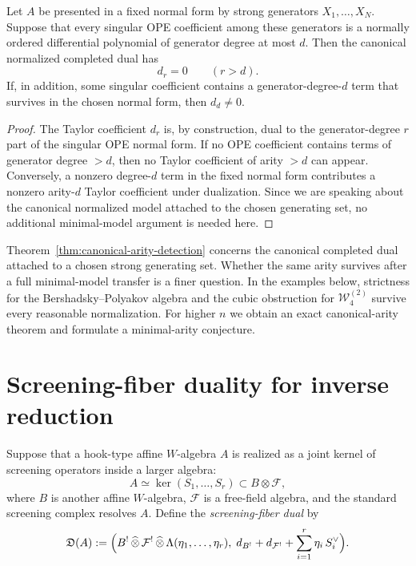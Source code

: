 \begin{theorem}
\label{thm:canonical-arity-detection}
Let $A$ be presented in a fixed normal form by strong generators
$X_1,\dots,X_N$.  Suppose that every singular OPE coefficient among these
generators is a normally ordered differential polynomial of generator degree at
most $d$.  Then the canonical normalized completed dual has
\[
d_r = 0 \qquad (r>d).
\]
If, in addition, some singular coefficient contains a generator-degree-$d$ term
that survives in the chosen normal form, then $d_d\neq 0$.
\end{theorem}

\begin{proof}
The Taylor coefficient $d_r$ is, by construction, dual to the generator-degree
$r$ part of the singular OPE normal form.  If no OPE coefficient contains terms
of generator degree $>d$, then no Taylor coefficient of arity $>d$ can appear.
Conversely, a nonzero degree-$d$ term in the fixed normal form contributes a
nonzero arity-$d$ Taylor coefficient under dualization.  Since we are speaking
about the canonical normalized model attached to the chosen generating set, no
additional minimal-model argument is needed here.
\end{proof}

\begin{remark}
Theorem~\ref{thm:canonical-arity-detection} concerns the canonical completed
dual attached to a chosen strong generating set.  Whether the same arity
survives after a full minimal-model transfer is a finer question.  In the
examples below, strictness for the Bershadsky--Polyakov algebra and the cubic
obstruction for $\mathcal W_4^{(2)}$ survive every reasonable normalization.
For higher $n$ we obtain an exact canonical-arity theorem and formulate a
minimal-arity conjecture.
\end{remark}

\section{Screening-fiber duality for inverse reduction}

\begin{construction}
\label{constr:screening-fiber-dual}
Suppose that a hook-type affine $W$-algebra $A$ is realized as a joint kernel of
screening operators inside a larger algebra:
\[
A \simeq \ker(S_1,\dots,S_r)\subset B\otimes \mathcal F,
\]
where $B$ is another affine $W$-algebra, $\mathcal F$ is a free-field algebra,
and the standard screening complex resolves $A$.  Define the
\emph{screening-fiber dual} by
\[
\mathfrak D(A):=
\Bigl(
B^!\,\widehat\otimes\,\mathcal F^!\,\widehat\otimes\,
\Lambda(\eta_1,\dots,\eta_r),
\;
d_{B^!}+d_{\mathcal F^!}+\sum_{i=1}^r \eta_i\,S_i^\vee
\Bigr).
\]
\end{construction}

